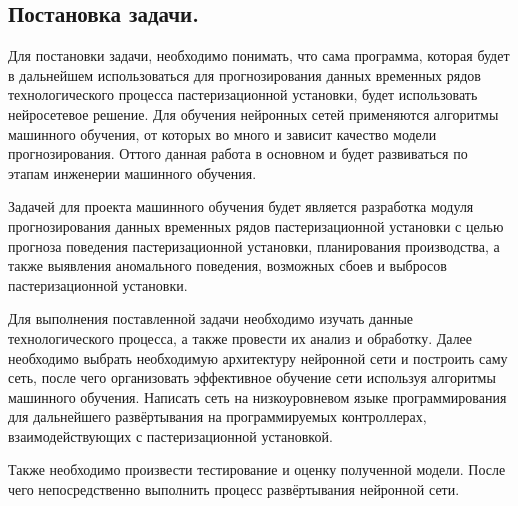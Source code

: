 \titlespace
\subsection*{  
  \cyrillicfont 
  \fontsize{14pt}{0pt}\selectfont
  \englishfont
   Постановка задачи. 
} 
\titlespace

{\cyrillicfont
\fontsize{13pt}{16.25pt}\selectfont 
\englishfont 

  \par \redline Для постановки задачи, необходимо понимать, что сама программа, которая будет в дальнейшем использоваться для прогнозирования данных временных рядов технологического процесса пастеризационной установки, будет использовать нейросетевое решение. Для обучения нейронных сетей применяются алгоритмы машинного обучения, от которых во много и зависит качество модели прогнозирования. Оттого данная работа в основном и будет развиваться по этапам инженерии машинного обучения. 

  \par \redline Задачей для проекта машинного обучения будет является разработка модуля прогнозирования данных временных рядов пастеризационной установки с целью прогноза поведения пастеризационной установки, планирования производства, а также выявления аномального поведения, возможных сбоев и выбросов пастеризационной установки. 

  \par \redline Для выполнения поставленной задачи необходимо изучать данные технологического процесса, а также провести их анализ и обработку. Далее необходимо выбрать необходимую архитектуру нейронной сети и построить саму сеть, после чего организовать эффективное обучение сети используя алгоритмы машинного обучения.  Написать сеть на низкоуровневом языке программирования для дальнейшего развёртывания на программируемых контроллерах, взаимодействующих с пастеризационной установкой. 

  \par \redline Также необходимо произвести тестирование и оценку полученной модели. После чего непосредственно выполнить процесс развёртывания нейронной сети.  

  \par 
}
